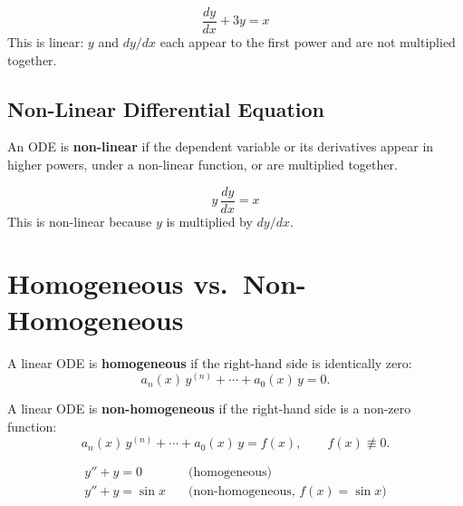 \begin{example}
\[
  \frac{dy}{dx} + 3y = x
\]
This is linear: $y$ and $dy/dx$ each appear to the first power and are not multiplied together.
\end{example}

\subsection{Non-Linear Differential Equation}

\begin{definition}
An ODE is \textbf{non-linear} if the dependent variable or its derivatives appear in higher powers, under a non-linear function, or are multiplied together.
\end{definition}

\begin{example}
\[
  y\,\frac{dy}{dx} = x
\]
This is non-linear because $y$ is multiplied by $dy/dx$.
\end{example}

\section{Homogeneous vs.\ Non-Homogeneous}

\begin{definition}
A linear ODE is \textbf{homogeneous} if the right-hand side is identically zero:
\[
  a_n(x)\,y^{(n)} + \cdots + a_0(x)\,y = 0.
\]
\end{definition}

\begin{definition}
A linear ODE is \textbf{non-homogeneous} if the right-hand side is a non-zero function:
\[
  a_n(x)\,y^{(n)} + \cdots + a_0(x)\,y = f(x), \qquad f(x) \not\equiv 0.
\]
\end{definition}

\begin{example}
\begin{align*}
  y'' + y = 0 &\quad \text{(homogeneous)}\\
  y'' + y = \sin x &\quad \text{(non-homogeneous, } f(x)=\sin x \text{)}
\end{align*}
\end{example}

